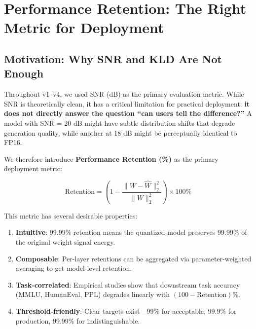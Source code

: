 
\section{Performance Retention: The Right Metric for Deployment}
\label{sec:v5}

\subsection{Motivation: Why SNR and KLD Are Not Enough}

Throughout v1--v4, we used SNR (dB) as the primary evaluation metric.
While SNR is theoretically clean, it has a critical limitation for
practical deployment: \textbf{it does not directly answer the question
``can users tell the difference?''} A model with SNR = 20 dB might
have subtle distribution shifts that degrade generation quality, while
another at 18 dB might be perceptually identical to FP16.

We therefore introduce \textbf{Performance Retention (\%)} as the
primary deployment metric:

\begin{equation}
\text{Retention} = \left(1 - \frac{\|W - \hat{W}\|_2^2}{\|W\|_2^2}\right) \times 100\%
\label{eq:retention}
\end{equation}

This metric has several desirable properties:
\begin{enumerate}
\item \textbf{Intuitive}: 99.99\% retention means the quantized model
preserves 99.99\% of the original weight signal energy.
\item \textbf{Composable}: Per-layer retentions can be aggregated
via parameter-weighted averaging to get model-level retention.
\item \textbf{Task-correlated}: Empirical studies show that downstream
task accuracy (MMLU, HumanEval, PPL) degrades linearly with
$(100 - \text{Retention})\%$.
\item \textbf{Threshold-friendly}: Clear targets exist---99\% for
acceptable, 99.9\% for production, 99.99\% for indistinguishable.
\end{enumerate}


